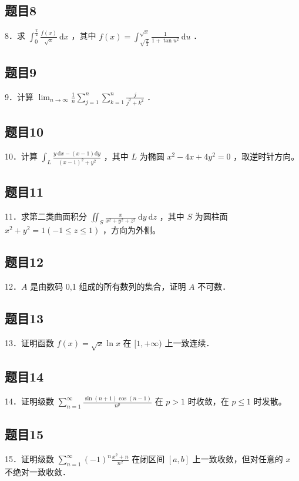 \documentclass{article}
\begin{document}
\subsection{题目8}
8．求 \(\int_{0}^{\frac{\pi}{2}} \frac{f(x)}{\sqrt{x}} \mathrm{~d} x\) ，其中 \(f(x)=\int_{\sqrt{\frac{\pi}{2}}}^{\sqrt{x}} \frac{1}{1+\tan u^{2}} \mathrm{~d} u\) ．

\subsection{题目9}
9．计算 \(\lim _{n \rightarrow \infty} \frac{1}{n} \sum_{j=1}^{n} \sum_{k=1}^{n} \frac{j}{j^{2}+k^{2}}\) ．

\subsection{题目10}
10．计算 \(\int_{L} \frac{y \mathrm{~d} x-(x-1) \mathrm{d} y}{(x-1)^{2}+y^{2}}\) ，其中 \(L\) 为椭圆 \(x^{2}-4 x+4 y^{2}=0\) ，取逆时针方向。

\subsection{题目11}
11．求第二类曲面积分 \(\iint_{S} \frac{x}{x^{2}+y^{2}+z^{2}} \mathrm{~d} y \mathrm{~d} z\) ，其中 \(S\) 为圆柱面 \(x^{2}+y^{2}=1(-1 \leq z \leq 1)\) ，方向为外侧。

\subsection{题目12}
12．\(A\) 是由数码 0,1 组成的所有数列的集合，证明 \(A\) 不可数．

\subsection{题目13}
13．证明函数 \(f(x)=\sqrt{x} \ln x\) 在 \([1,+\infty)\) 上一致连续．

\subsection{题目14}
14．证明级数 \(\sum_{n=1}^{\infty} \frac{\sin (n+1) \cos (n-1)}{n^{p}}\) 在 \(p>1\) 时收敛，在 \(p \leq 1\) 时发散。

\subsection{题目15}
15．证明级数 \(\sum_{n=1}^{\infty}(-1)^{n} \frac{x^{2}+n}{n^{2}}\) 在闭区间 \([a, b]\) 上一致收敛，但对任意的 \(x\) 不绝对一致收敛．
\end{document}
